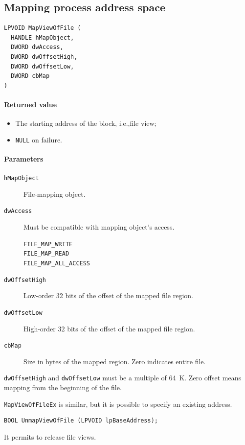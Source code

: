 \subsection{Mapping process address space}
\begin{verbatim}
LPVOID MapViewOfFile (
  HANDLE hMapObject,
  DWORD dwAccess,
  DWORD dwOffsetHigh,
  DWORD dwOffsetLow,
  DWORD cbMap
)
\end{verbatim}

\paragraph{Returned value}
\begin{itemize}
\item The starting address of the block, i.e.,\@ file view;
\item \texttt{NULL} on failure.
\end{itemize}

\paragraph{Parameters}
\begin{description}
\item [\texttt{hMapObject}] File-mapping object.
\item [\texttt{dwAccess}] Must be compatible with mapping object's access.
\begin{description}
\item [\texttt{FILE\_MAP\_WRITE}]
\item [\texttt{FILE\_MAP\_READ}]
\item [\texttt{FILE\_MAP\_ALL\_ACCESS}]
\end{description}
\item [\texttt{dwOffsetHigh}] Low-order 32 bits of the offset of the mapped file region.
\item [\texttt{dwOffsetLow}] High-order 32 bits of the offset of the mapped file region.
\item [\texttt{cbMap}] Size in bytes of the mapped region. Zero indicates entire file.
\end{description}
\texttt{dwOffsetHigh} and \texttt{dwOffsetLow} must be a multiple of 64~K. Zero offset means mapping from the beginning of the file.

\texttt{MapViewOfFileEx} is similar, but it is possible to specify an existing address.

\begin{verbatim}
BOOL UnmapViewOfFile (LPVOID lpBaseAddress);
\end{verbatim}
It permits to release file views.

